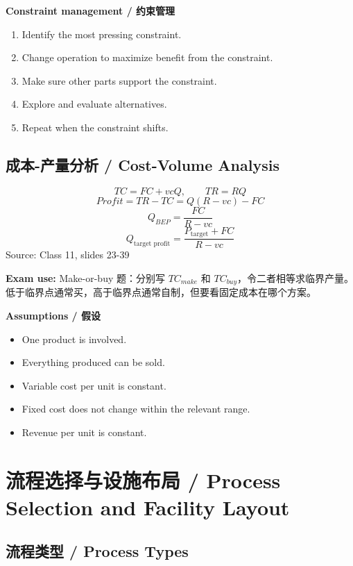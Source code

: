 \documentclass[10pt,a4paper]{ctexart}
\newcommand{\source}[1]{\textcolor{Muted}{\footnotesize Source: #1}}
\newcommand{\exam}[1]{\textcolor{Amber}{\textbf{Exam use:} #1}}
\begin{document}
\textbf{Constraint management / 约束管理}
\begin{enumerate}
  \item Identify the most pressing constraint.
  \item Change operation to maximize benefit from the constraint.
  \item Make sure other parts support the constraint.
  \item Explore and evaluate alternatives.
  \item Repeat when the constraint shifts.
\end{enumerate}

\subsection{成本-产量分析 / Cost-Volume Analysis}
\label{subsec:cvp}

\[
TC=FC+vcQ,\qquad TR=RQ
\]
\[
Profit=TR-TC=Q(R-vc)-FC
\]
\[
Q_{BEP}=\frac{FC}{R-vc}
\]
\[
Q_{\text{target profit}}=\frac{P_{\text{target}}+FC}{R-vc}
\]
\source{Class 11, slides 23-39}

\exam{Make-or-buy 题：分别写 $TC_{make}$ 和 $TC_{buy}$，令二者相等求临界产量。低于临界点通常买，高于临界点通常自制，但要看固定成本在哪个方案。}

\textbf{Assumptions / 假设}
\begin{itemize}
  \item One product is involved.
  \item Everything produced can be sold.
  \item Variable cost per unit is constant.
  \item Fixed cost does not change within the relevant range.
  \item Revenue per unit is constant.
\end{itemize}

\section{流程选择与设施布局 / Process Selection and Facility Layout}
\label{sec:layout}

\subsection{流程类型 / Process Types}
\label{subsec:process-types}
\end{document}
